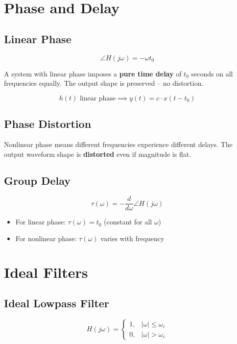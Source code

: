 \documentclass[11pt]{article}
\begin{document}
\section*{Phase and Delay}

\subsection*{Linear Phase}

\[\angle H(j\omega) = -\omega t_0\]

A system with linear phase imposes a \textbf{pure time delay} of $t_0$ seconds on all frequencies equally. The output shape is preserved -- no distortion.

\[h(t) \text{ linear phase} \implies y(t) = c \cdot x(t - t_0)\]

\subsection*{Phase Distortion}

Nonlinear phase means different frequencies experience different delays. The output waveform shape is \textbf{distorted} even if magnitude is flat.

\subsection*{Group Delay}

\[\tau(\omega) = -\frac{d}{d\omega} \angle H(j\omega)\]

\begin{itemize}
  \item For linear phase: $\tau(\omega) = t_0$ (constant for all $\omega$)
  \item For nonlinear phase: $\tau(\omega)$ varies with frequency
\end{itemize}

\section*{Ideal Filters}

\subsection*{Ideal Lowpass Filter}

\[H(j\omega) = \begin{cases} 1, & |\omega| \leq \omega_c \\ 0, & |\omega| > \omega_c \end{cases}\]
\end{document}
